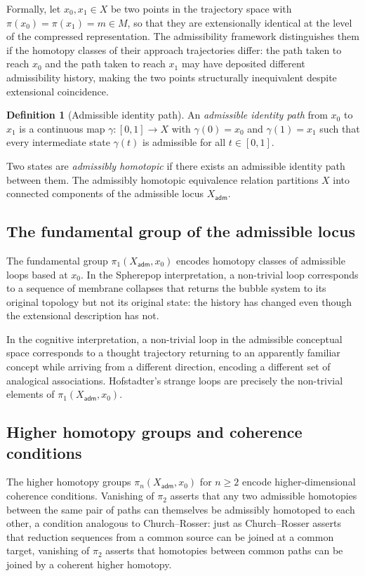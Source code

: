 \documentclass[12pt, a4paper]{article}
\theoremstyle{plain}
\theoremstyle{definition}
\newtheorem{definition}[theorem]{Definition}
\theoremstyle{remark}
\begin{document}
Formally, let $x_0, x_1 \in X$ be two points in the trajectory space with
$\pi(x_0) = \pi(x_1) = m \in M$, so that they are extensionally identical at the
level of the compressed representation. The admissibility framework distinguishes them
if the homotopy classes of their approach trajectories differ: the path taken to reach
$x_0$ and the path taken to reach $x_1$ may have deposited different admissibility
history, making the two points structurally inequivalent despite extensional coincidence.

\begin{definition}[Admissible identity path]
  An \emph{admissible identity path} from $x_0$ to $x_1$ is a continuous map
  $\gamma : [0,1] \to X$ with $\gamma(0) = x_0$ and $\gamma(1) = x_1$ such that every
  intermediate state $\gamma(t)$ is admissible for all $t \in [0,1]$.
\end{definition}

Two states are \emph{admissibly homotopic} if there exists an admissible identity path
between them. The admissibly homotopic equivalence relation partitions $X$ into
connected components of the admissible locus $X_{\mathsf{adm}}$.

\subsection{The fundamental group of the admissible locus}

The fundamental group $\pi_1(X_{\mathsf{adm}}, x_0)$ encodes homotopy classes of
admissible loops based at $x_0$. In the Spherepop interpretation, a non-trivial loop
corresponds to a sequence of membrane collapses that returns the bubble system to its
original topology but not its original state: the history has changed even though the
extensional description has not.

In the cognitive interpretation, a non-trivial loop in the admissible conceptual space
corresponds to a thought trajectory returning to an apparently familiar concept while
arriving from a different direction, encoding a different set of analogical associations.
Hofstadter's strange loops are precisely the non-trivial elements of
$\pi_1(X_{\mathsf{adm}}, x_0)$.

\subsection{Higher homotopy groups and coherence conditions}

The higher homotopy groups $\pi_n(X_{\mathsf{adm}}, x_0)$ for $n \geq 2$ encode
higher-dimensional coherence conditions. Vanishing of $\pi_2$ asserts that any two
admissible homotopies between the same pair of paths can themselves be admissibly
homotoped to each other, a condition analogous to Church--Rosser: just as Church--Rosser
asserts that reduction sequences from a common source can be joined at a common target,
vanishing of $\pi_2$ asserts that homotopies between common paths can be joined by a
coherent higher homotopy.
\end{document}

